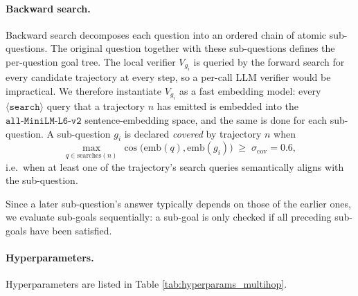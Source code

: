 \paragraph{Backward search.}
Backward search decomposes each question into an ordered chain of atomic sub-questions. The
original question together with these sub-questions defines the
per-question goal tree.
The local verifier $V_{g_i}$ is queried by the forward search for
every candidate trajectory at every step, so a per-call LLM verifier would be impractical. We therefore
instantiate $V_{g_i}$ as a fast embedding model: every
$\langle\texttt{search}\rangle$ query that a trajectory $n$ has emitted
is embedded into the $\texttt{all-MiniLM-L6-v2}$ sentence-embedding
space, and the same is done for each sub-question. A sub-question
$g_i$ is declared \emph{covered} by trajectory $n$ when
\begin{equation}
\max_{q \in \mathrm{searches}(n)}\,
  \cos\bigl(\mathrm{emb}(q),\mathrm{emb}(g_i)\bigr) \;\ge\; \sigma_\mathrm{cov} = 0.6,
\end{equation}
i.e.\ when at least one of the trajectory's search queries
semantically aligns with the sub-question. 

Since a later sub-question's answer typically depends on those of the earlier ones, we evaluate sub-goals sequentially: a sub-goal is only checked if all preceding sub-goals have been satisfied.

\paragraph{Hyperparameters.}
Hyperparameters are listed in Table \ref{tab:hyperparams_multihop}.


